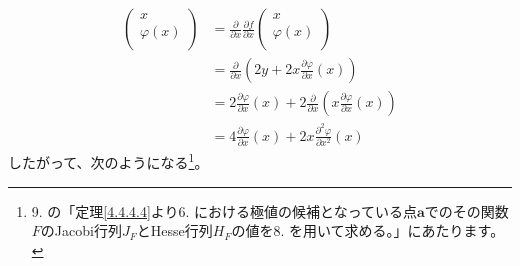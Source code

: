 \documentclass[dvipdfmx]{jsarticle}
\begin{document}
\begin{align*}
\begin{pmatrix}
x \\
\varphi(x) \\
\end{pmatrix} &= \frac{\partial}{\partial x}\frac{\partial f}{\partial x}\begin{pmatrix}
x \\
\varphi(x) \\
\end{pmatrix} \\
&= \frac{\partial}{\partial x}\left( 2y + 2x\frac{\partial\varphi}{\partial x}(x) \right) \\
&= 2\frac{\partial\varphi}{\partial x}(x) + 2\frac{\partial}{\partial x}\left( x\frac{\partial\varphi}{\partial x}(x) \right)\\
&= 4\frac{\partial\varphi}{\partial x}(x) + 2x\frac{\partial^{2}\varphi}{\partial x^{2}}(x)
\end{align*}
したがって、次のようになる\footnote{9. の「定理\ref{4.4.4.4}より6. における極値の候補となっている点$\mathbf{a}$でのその関数$F$のJacobi行列$J_{F}$とHesse行列$H_{F}$の値を8. を用いて求める。」にあたります。}。
\end{document}
